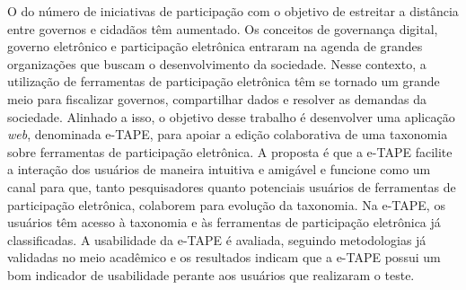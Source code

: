 \newpage
\begin{resumo}
O do número de iniciativas de participação com o objetivo de estreitar a distância entre governos e cidadãos têm aumentado. 
Os conceitos de governança digital, governo eletrônico e participação eletrônica entraram na agenda de grandes organizações 
que buscam o desenvolvimento da sociedade. Nesse contexto, a utilização de ferramentas de participação eletrônica têm se tornado um 
grande meio para fiscalizar governos, compartilhar dados e resolver as demandas da sociedade.
Alinhado a isso, o objetivo desse trabalho é desenvolver uma aplicação \textit{web}, denominada e-TAPE, para apoiar a edição 
colaborativa de uma taxonomia sobre ferramentas de participação eletrônica. A proposta é que a e-TAPE facilite a interação dos usuários 
de maneira intuitiva e amigável e funcione como um canal para que, tanto pesquisadores quanto potenciais usuários de ferramentas de 
participação eletrônica, colaborem para evolução da taxonomia. Na e-TAPE, os usuários têm acesso à taxonomia e às ferramentas de 
participação eletrônica já classificadas. A usabilidade da e-TAPE é avaliada, seguindo metodologias já validadas no meio acadêmico e
os resultados indicam que a e-TAPE possui um bom indicador de usabilidade perante aos usuários que realizaram o teste. 
\end{resumo}
\newpage